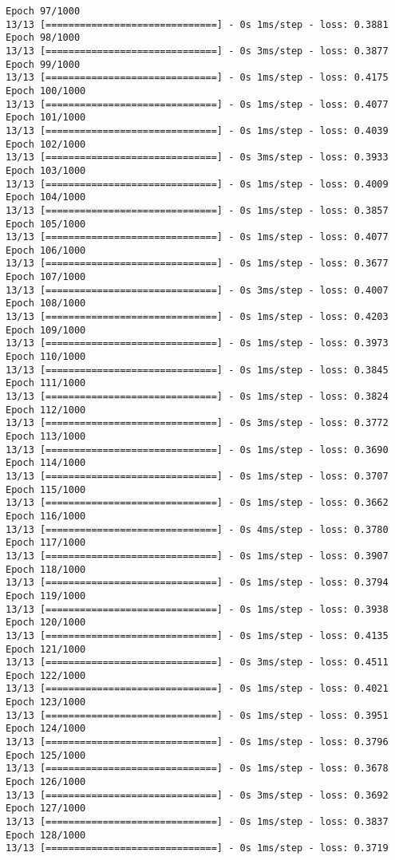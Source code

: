 \documentclass[11pt]{article}
\begin{document}
\begin{Verbatim}[commandchars=\\\{\}]
Epoch 97/1000
13/13 [==============================] - 0s 1ms/step - loss: 0.3881
Epoch 98/1000
13/13 [==============================] - 0s 3ms/step - loss: 0.3877
Epoch 99/1000
13/13 [==============================] - 0s 1ms/step - loss: 0.4175
Epoch 100/1000
13/13 [==============================] - 0s 1ms/step - loss: 0.4077
Epoch 101/1000
13/13 [==============================] - 0s 1ms/step - loss: 0.4039
Epoch 102/1000
13/13 [==============================] - 0s 3ms/step - loss: 0.3933
Epoch 103/1000
13/13 [==============================] - 0s 1ms/step - loss: 0.4009
Epoch 104/1000
13/13 [==============================] - 0s 1ms/step - loss: 0.3857
Epoch 105/1000
13/13 [==============================] - 0s 1ms/step - loss: 0.4077
Epoch 106/1000
13/13 [==============================] - 0s 1ms/step - loss: 0.3677
Epoch 107/1000
13/13 [==============================] - 0s 3ms/step - loss: 0.4007
Epoch 108/1000
13/13 [==============================] - 0s 1ms/step - loss: 0.4203
Epoch 109/1000
13/13 [==============================] - 0s 1ms/step - loss: 0.3973
Epoch 110/1000
13/13 [==============================] - 0s 1ms/step - loss: 0.3845
Epoch 111/1000
13/13 [==============================] - 0s 1ms/step - loss: 0.3824
Epoch 112/1000
13/13 [==============================] - 0s 3ms/step - loss: 0.3772
Epoch 113/1000
13/13 [==============================] - 0s 1ms/step - loss: 0.3690
Epoch 114/1000
13/13 [==============================] - 0s 1ms/step - loss: 0.3707
Epoch 115/1000
13/13 [==============================] - 0s 1ms/step - loss: 0.3662
Epoch 116/1000
13/13 [==============================] - 0s 4ms/step - loss: 0.3780
Epoch 117/1000
13/13 [==============================] - 0s 1ms/step - loss: 0.3907
Epoch 118/1000
13/13 [==============================] - 0s 1ms/step - loss: 0.3794
Epoch 119/1000
13/13 [==============================] - 0s 1ms/step - loss: 0.3938
Epoch 120/1000
13/13 [==============================] - 0s 1ms/step - loss: 0.4135
Epoch 121/1000
13/13 [==============================] - 0s 3ms/step - loss: 0.4511
Epoch 122/1000
13/13 [==============================] - 0s 1ms/step - loss: 0.4021
Epoch 123/1000
13/13 [==============================] - 0s 1ms/step - loss: 0.3951
Epoch 124/1000
13/13 [==============================] - 0s 1ms/step - loss: 0.3796
Epoch 125/1000
13/13 [==============================] - 0s 1ms/step - loss: 0.3678
Epoch 126/1000
13/13 [==============================] - 0s 3ms/step - loss: 0.3692
Epoch 127/1000
13/13 [==============================] - 0s 1ms/step - loss: 0.3837
Epoch 128/1000
13/13 [==============================] - 0s 1ms/step - loss: 0.3719

\end{Verbatim}
\end{document}
